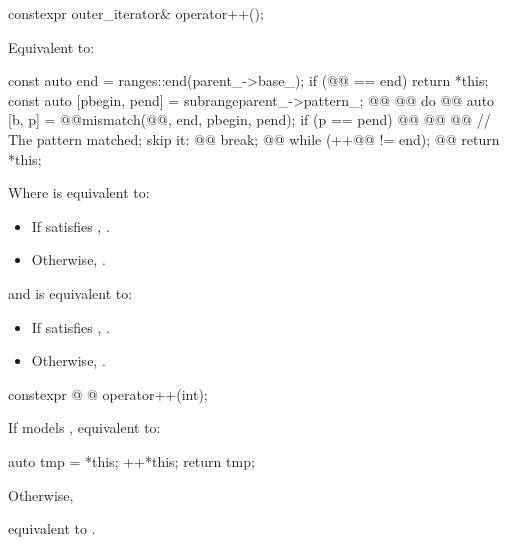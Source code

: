 {%
\begin{itemdecl}
constexpr outer_iterator& operator++();
\end{itemdecl}

\begin{itemdescr}
\pnum
\effects Equivalent to:
\begin{codeblock}
const auto end = ranges::end(parent_->base_);
if (@@ == end) return *this;
const auto [pbegin, pend] = subrange{parent_->pattern_};
@@
@@
  do {
    @@ auto [b, p] = @@mismatch(@@, end, pbegin, pend);
    if (p == pend) @@ @\newtxt{\{}@
      @@ // The pattern matched; skip it:
      @@
      break;
    @\newtxt{\}}@
  } while (++@@ != end);
@\newtxt{\}}@
return *this;
\end{codeblock}
\end{itemdescr}

{\color{oldclr}
Where  is equivalent to:
\begin{itemize}
\item If  satisfies , .

\item Otherwise, .
\end{itemize}

and  is equivalent to:
\begin{itemize}
\item If  satisfies ,
.

\item Otherwise, .
\end{itemize}
} %

%
\begin{itemdecl}
constexpr @ @ operator++(int);
\end{itemdecl}

\begin{itemdescr}
\pnum
\effects
{\color{newclr}
If  models , equivalent to:
\begin{codeblock}
auto tmp = *this;
++*this;
return tmp;
\end{codeblock}
Otherwise,
} %
equivalent to .
\end{itemdescr}

}
